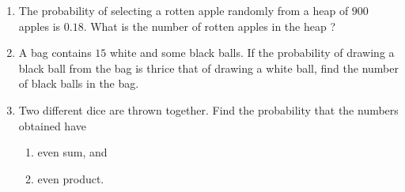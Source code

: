 \begin{enumerate}
\item The probability of selecting a rotten apple randomly from a heap of $900$ apples is $0.18$. What is the number of rotten apples in the heap ?
\item A bag contains $15$ white and some black balls. If the probability of drawing a black ball from the bag is thrice that of drawing a white ball, find the number of black balls in the bag.
\item Two different dice are thrown together. Find the probability that the numbers obtained have
\begin{enumerate}[label=\roman*]
\item even sum, and
\item even product.
\end{enumerate}
\end{enumerate}
